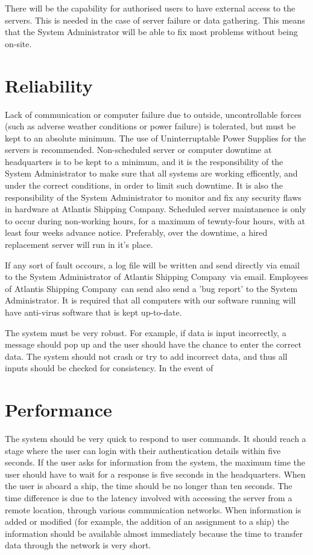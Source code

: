 \documentclass[a4paper,10pt]{report}
\begin{document}
There will be the capability for authorised users to have external access to the servers. This is needed in the case of server failure or data gathering.  This means that the System Administrator will be able to fix most problems without being on-site.



\section{Reliability}
Lack of communication or computer failure due to outside, uncontrollable forces (such as adverse weather conditions or power failure) is tolerated, but must be kept to an absolute minimum. The use of Uninterruptable Power Supplies for the servers is recommended. Non-scheduled server or computer downtime at headquarters is to be kept to a minimum, and it is the responsibility of the System Administrator to make sure that all systems are working efficently, and under the correct conditions, in order to limit such downtime.  It is also the responsibility of the System Administrator to monitor and fix any security flaws in hardware at Atlantis Shipping Company\textregistered.  Scheduled server maintanence is only to occur during non-working hours, for a maximum of tewnty-four hours, with at least four weeks advance notice. Preferably, over the downtime, a hired replacement server will run in it's place.

If any sort of fault occours, a log file will be written and send directly via email to the System Administrator of Atlantis Shipping Company\textregistered\ via email.  Employees of Atlantis Shipping Company\textregistered \ can send also send a 'bug report' to the System Administrator.  It is required that all computers with our software running will have anti-virus software that is kept up-to-date.

The system must be very robust. For example, if data is input incorrectly, a message should pop up and the user should have the chance to enter the correct data.  The system should not crash or try to add incorrect data, and thus all inputs should be checked for consistency.  In the event of 



\section{Performance}
The system should be very quick to respond to user commands.  It should reach a stage where the user can login with their authentication details within five seconds.  If the user asks for information from the system, the maximum time the user should have to wait for a response is five seconds in the headquarters.  When the user is aboard a ship, the time should be no longer than ten seconds. The time difference is due to the latency involved with accessing the server from a remote location, through various communication networks.  When information is added or modified (for example, the addition of an assignment to a ship) the information should be available almost immediately because the time to transfer data through the network is very short.
\end{document}
